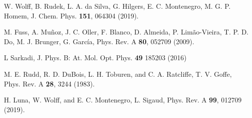 \documentclass[10pt,showpacs,showkeys,twocolumn]{revtex4}
\begin{document}
\begin{thebibliography}{}
W. Wolff, B. Rudek, L. A. da Silva, G. Hilgers, E. C. Montenegro, 
M. G. P. Homem,
J. Chem. Phys. \textbf{151}, 064304 (2019).

M. Fuss, A. Muñoz, J. C. Oller, F. Blanco, D. Almeida, P. Limão-Vieira, 
T. P. D. Do, M. J. Brunger, G. Garc\'{i}a,
Phys. Rev. A \textbf{80}, 052709 (2009).

 L Sarkadi, J. Phys. B: At. Mol. Opt. Phys. \textbf{49} 185203 (2016)


 M. E. Rudd, R. D. DuBois, L. H. Toburen, and C. A. Ratcliffe, T. V. Goffe, Phys. Rev. A \textbf{28}, 3244 (1983).

 H. Luna, W. Wolff, and E. C. Montenegro, L. Sigaud, Phys. Rev. A \textbf{99}, 012709 (2019).


\end{thebibliography}
\end{document}
